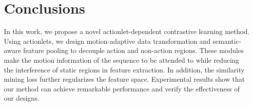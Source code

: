 \documentclass[twocolumn]{article}
\begin{document}
\section{Conclusions}
In this work, we propose a novel actionlet-dependent contrastive learning method. Using actionlets, we design motion-adaptive data transformation and semantic-aware feature pooling to decouple action and non-action regions. These modules make the motion information of the sequence to be attended to while reducing the interference of static regions in feature extraction. In addition, the similarity mining loss further regularizes the feature space. Experimental results show that our method can achieve remarkable performance and verify the effectiveness of our designs.
\end{document}
